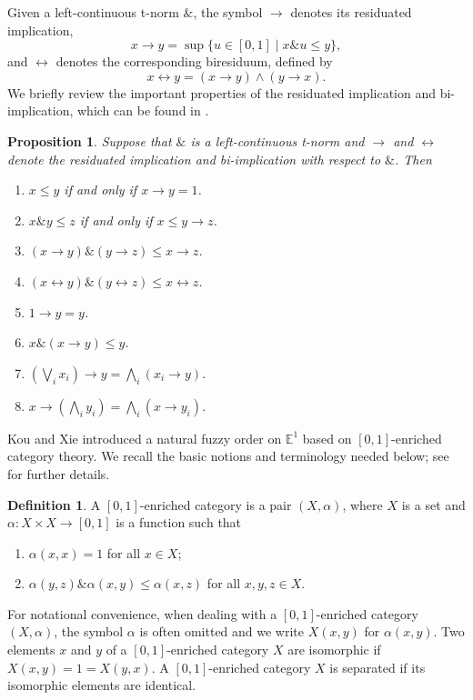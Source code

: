 \documentclass[preprint,3p,times]{elsarticle}
\theoremstyle{plain}
\newtheorem{prop}[thm]{Proposition}
\theoremstyle{definition}
\newtheorem{definition}[thm]{Definition}
\numberwithin{equation}{section}
\begin{document}
Given a left-continuous t-norm \(\&\), the symbol \(\rightarrow\) denotes its residuated implication,
\[
x\rightarrow y = \sup\{u \in [0,1] \mid x\mathbin{\&} u \leq y\},
\]
and \(\leftrightarrow\) denotes the corresponding biresiduum, defined by
\[
x\leftrightarrow y=(x\rightarrow y)\wedge (y\rightarrow x).
\]
We briefly review the  important properties of the residuated implication and bi-implication, which can be found in \cite{HL2006}.
\begin{prop}\label{prop:residuum-properties}
    Suppose that \( \& \) is a left-continuous t-norm and \( \rightarrow \) and \( \leftrightarrow \) denote the residuated implication and bi-implication with respect to \( \& \). Then
\begin{enumerate}[label={\textup{(\arabic*)}}]
    \item \( x \leq y \) if and only if \( x\rightarrow y = 1 \).
    \item \( x\& y \leq z \) if and only if \( x \leq y\rightarrow z \).
    \item \( (x\rightarrow y)\& (y\rightarrow z) \leq x\rightarrow z \).
    \item \( (x\leftrightarrow y)\& (y\leftrightarrow z) \leq x\leftrightarrow z \).
    \item \( 1\rightarrow y = y \).
    \item \( x\&( x \rightarrow y) \leq y \).
    \item \(( \bigvee_{i} x_i)\rightarrow y=\bigwedge_i(x_i\rightarrow y)\).
    \item \( x\rightarrow(\bigwedge_i y_i) =\bigwedge_i (x\rightarrow y_i)\).
\end{enumerate}
\end{prop}
Kou and Xie introduced a natural fuzzy order on \(\mathbb{E}^1\)
based on \([0,1]\)-enriched category theory. We recall the basic
notions and terminology needed below; see
\cite{Zhang2024IntroductoryNO} for further details.
\begin{definition}
	A \([0,1]\)-enriched category is a pair $(X, \alpha)$, where $X$ is a set and $\alpha: X \times X \to [0,1]$ is a function such that
	\begin{enumerate}[label={\textup{(\arabic*)}}]
		\item $\alpha(x, x) = 1$ for all $x \in X$;
		\item  $\alpha(y, z) \& \alpha(x, y) \leq \alpha(x, z)$ for all $x, y, z \in X$.
	\end{enumerate}
\end{definition}
For notational convenience, when dealing with a \([0,1]\)-enriched category \((X,\alpha)\), the symbol \(\alpha\) is often omitted and we write $X(x,y)$ for $\alpha(x,y)$.
Two elements $x$ and $y$ of a \([0,1]\)-enriched category $X$ are isomorphic if $X(x,y) = 1 = X(y,x)$. A \([0,1]\)-enriched category $X$ is separated if its isomorphic elements are identical.
\end{document}
